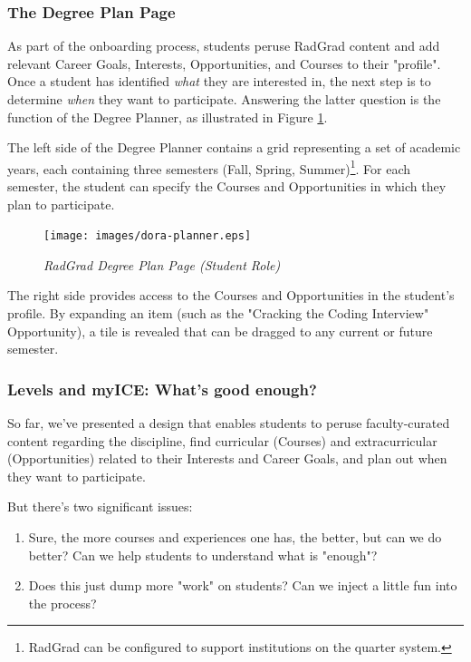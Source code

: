 \documentclass[acmsmall]{acmart}
\begin{document}
\subsubsection{The Degree Plan Page}

As part of the onboarding process, students peruse RadGrad content and add relevant Career Goals, Interests, Opportunities, and Courses to their "profile".  Once a student has identified {\em what} they are interested in, the next step is to determine {\em when} they want to participate. Answering the latter question is the function of the Degree Planner, as illustrated in  Figure \ref{fig:radgrad-student-degree-plan}.

The left side of the Degree Planner contains a grid representing a set of academic years, each containing three semesters (Fall, Spring, Summer)\footnote{RadGrad can be configured to support institutions on the quarter system.}.  For each semester, the student can specify the Courses and Opportunities in which they plan to participate.

\begin{figure}[ht]
\centering
\texttt{[image: images/dora-planner.eps]}
\caption{\em RadGrad Degree Plan Page (Student Role)}
\label{fig:radgrad-student-degree-plan}
\end{figure}

The right side provides access to the Courses and Opportunities in the student's profile. By expanding an item (such as the "Cracking the Coding Interview" Opportunity), a tile is revealed that can be dragged to any current or future semester.

\subsubsection{Levels and myICE: What's good enough?}

So far, we've presented a design that enables students to peruse faculty-curated content regarding the discipline, find curricular (Courses) and extracurricular (Opportunities) related to their Interests and Career Goals, and plan out when they want to participate.

But there's two significant issues:
\begin{enumerate}
\item Sure, the more courses and experiences one has, the better, but can we do better? Can we help students to understand what is "enough"?
\item Does this just dump more "work" on students? Can we inject a little fun into the process?
\end{enumerate}
\end{document}
